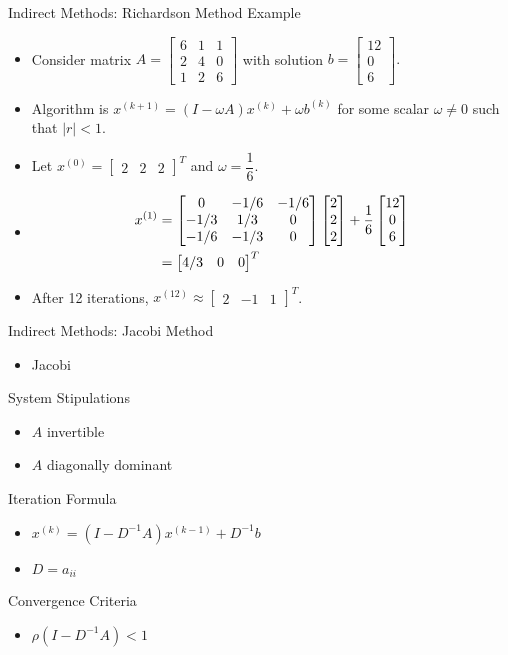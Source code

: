 \documentclass[9pt, serif]{beamer}
\newlength{\wideitemsep}
\let\olditem\item
\renewcommand{\item}{\setlength{\itemsep}{\wideitemsep}\olditem}
\newcommand{\bi}{\begin{itemize}}
\newcommand{\ei}{\end{itemize}}
\begin{document}
\begin{frame}{Indirect Methods: Richardson Method Example}
\pause
\bi
\item Consider matrix $A=\begin{bmatrix}6&1&1\\2&4&0\\1&2&6\end{bmatrix}$ with solution $b=\begin{bmatrix}12\\0\\6\end{bmatrix}.$
\pause
\item Algorithm is $x^{(k+1)} = (I-\omega A)x^{(k)}+\omega b^{(k)}$ for some scalar $\omega\neq 0$ such that $|r|<1$.
\pause
\item Let $x^{(0)} = \begin{bmatrix}2&2&2\end{bmatrix}^T$ and $\omega = \dfrac{1}{6}$.
\pause
\item \begin{align*}
	x^{(1)} &= \begin{bmatrix}0&-1/6&-1/6\\-1/3&1/3&0\\-1/6&-1/3&0\end{bmatrix}\begin{bmatrix}2\\2\\2\end{bmatrix}+\dfrac{1}{6}\begin{bmatrix}12\\0\\6\end{bmatrix}\\
	\vspace{2cm}
	& = \begin{bmatrix}4/3&0&0\end{bmatrix}^T
\end{align*}
\pause
\item After 12 iterations, $x^{(12)}\approx \begin{bmatrix}2&-1&1\end{bmatrix}^T$.
\ei
\end{frame}


\begin{frame}{Indirect Methods: Jacobi}
    Method
    \bi
        \item Jacobi
    \ei
    System Stipulations
    \bi
        \item $A$ invertible
        \item $A$ diagonally dominant
    \ei
    Iteration Formula
    \bi
        \item $x^{(k)} = (I-D^{-1}A)x^{(k-1)}+D^{-1}b$
        \item $D = a_{ii}$
    \ei
    Convergence Criteria
    \bi
        \item $\rho(I-D^{-1}A)<1$
    \ei
\end{frame}
\end{document}
